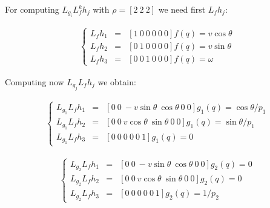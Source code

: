 \documentclass[letterpaper, 10 pt, conference]{ieeeconf}  %
\begin{document}
%

For computing $L_{g_i}L_f^kh_j$ with $\rho = [2\ 2\ 2]$ we need first $L_fh_j$:

\begin{eqnarray}
\left\lbrace\begin{array}{lcl}
L_{f}h_1 & = & [1\ 0\ 0\ 0\ 0\ 0]f(q) = v\cos\theta\\
L_{f}h_2 & = & [0\ 1\ 0\ 0\ 0\ 0]f(q) = v\sin\theta\\
L_{f}h_3 & = & [0\ 0\ 1\ 0\ 0\ 0]f(q) = \omega
\end{array}\right.
\end{eqnarray}

Computing now $L_{g_j}L_fh_j$ we obtain:

\begin{eqnarray}
\left\lbrace\begin{array}{lcl}
L_{g_1}L_{f}h_1 & = & [0\ 0\ -v\sin\theta\ \cos\theta\ 0\ 0]g_1(q) = \cos\theta/p_1\\
L_{g_1}L_{f}h_2 & = & [0\ 0\ v\cos\theta\ \sin\theta\ 0\ 0]g_1(q) = \sin\theta/p_1\\
L_{g_1}L_{f}h_3 & = & [0\ 0\ 0\ 0\ 0\ 1]g_1(q) = 0
\end{array}\right.
\end{eqnarray}

\begin{eqnarray}
\left\lbrace\begin{array}{lcl}
L_{g_2}L_{f}h_1 & = & [0\ 0\ -v\sin\theta\ \cos\theta\ 0\ 0]g_2(q) = 0\\
L_{g_2}L_{f}h_2 & = & [0\ 0\ v\cos\theta\ \sin\theta\ 0\ 0]g_2(q) = 0\\
L_{g_2}L_{f}h_3 & = & [0\ 0\ 0\ 0\ 0\ 1]g_2(q) = 1/p_2
\end{array}\right.
\end{eqnarray}
\end{document}

